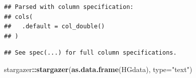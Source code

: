 \documentclass[]{book}
\newenvironment{Shaded}{\begin{snugshade}}{\end{snugshade}}
\newcommand{\KeywordTok}[1]{\textcolor[rgb]{0.13,0.29,0.53}{\textbf{#1}}}
\newcommand{\DataTypeTok}[1]{\textcolor[rgb]{0.13,0.29,0.53}{#1}}
\newcommand{\StringTok}[1]{\textcolor[rgb]{0.31,0.60,0.02}{#1}}
\newcommand{\OperatorTok}[1]{\textcolor[rgb]{0.81,0.36,0.00}{\textbf{#1}}}
\newcommand{\NormalTok}[1]{#1}
\begin{document}
\begin{verbatim}
## Parsed with column specification:
## cols(
##   .default = col_double()
## )
\end{verbatim}

\begin{verbatim}
## See spec(...) for full column specifications.
\end{verbatim}

\begin{Shaded}
\begin{Highlighting}[]
\NormalTok{stargazer}\OperatorTok{::}\KeywordTok{stargazer}\NormalTok{(}\KeywordTok{as.data.frame}\NormalTok{(HGdata), }\DataTypeTok{type=}\StringTok{"text"}\NormalTok{)}
\end{Highlighting}
\end{Shaded}
\end{document}

